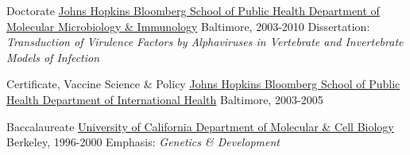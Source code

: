 \begin{cventries}

	\cventry
		{Doctorate}
		{\href{http://www.jhsph.edu/departments/w-harry-feinstone-department-of-molecular-microbiology-and-immunology/}{Johns Hopkins Bloomberg School of Public Health \newline Department of Molecular Microbiology \& Immunology}}
		{Baltimore, }
		{2003-2010}
        {Dissertation: \textit{Transduction of Virulence Factors by Alphaviruses in Vertebrate and Invertebrate Models of Infection}}

	\cventry
		{Certificate, Vaccine Science \& Policy}
		{\href{http://www.jhsph.edu/departments/international-health/}{Johns Hopkins Bloomberg School of Public Health \newline Department of International Health}}
		{Baltimore, }
		{2003-2005}
		{}

	\cventry
		{Baccalaureate}
		{\href{http://mcb.berkeley.edu/}{University of California \newline Department of Molecular \& Cell Biology}}
		{Berkeley, }
		{1996-2000}
		{Emphasis: \textit{Genetics \& Development}}

\end{cventries}
